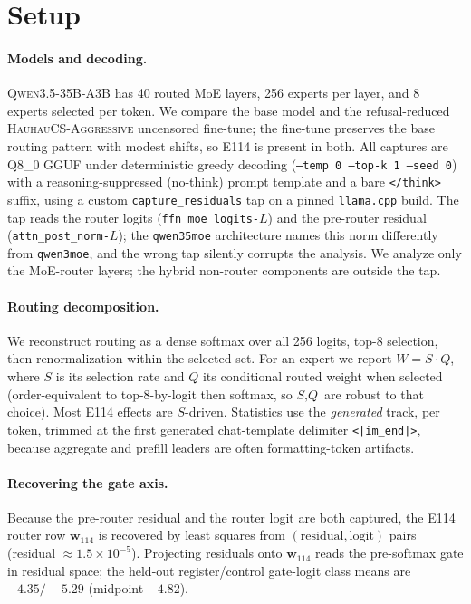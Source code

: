 \documentclass[10pt,a4paper,twocolumn]{article}
\newcommand{\W}{\textit{W}}
\newcommand{\Sel}{\textit{S}}
\newcommand{\Q}{\textit{Q}}
\newcommand{\wvec}{\mathbf{w}_{114}}
\begin{document}
\section{Setup}

\paragraph{Models and decoding.}
\textsc{Qwen3.5-35B-A3B} has 40 routed MoE layers, 256 experts per layer, and 8
experts selected per token. We compare the base model and the refusal-reduced
\textsc{HauhauCS-Aggressive} uncensored fine-tune; the fine-tune preserves the
base routing pattern with modest shifts, so E114 is present in both. All captures
are Q8\_0 GGUF under deterministic greedy decoding (\texttt{--temp 0 --top-k 1
--seed 0}) with a reasoning-suppressed (no-think) prompt template and a bare
\texttt{</think>} suffix, using a custom \texttt{capture\_residuals} tap on a
pinned \texttt{llama.cpp} build. The tap reads the router logits
(\texttt{ffn\_moe\_logits-}$L$) and the pre-router residual
(\texttt{attn\_post\_norm-}$L$); the \texttt{qwen35moe} architecture names this
norm differently from \texttt{qwen3moe}, and the wrong tap silently corrupts the
analysis. We analyze only the MoE-router layers; the hybrid non-router components
are outside the tap.

\paragraph{Routing decomposition.}
We reconstruct routing as a dense softmax over all 256 logits, top-8 selection,
then renormalization within the selected set. For an expert we report
$\W{=}\Sel\!\cdot\!\Q$, where $\Sel$ is its selection rate and $\Q$ its
conditional routed weight when selected (order-equivalent to top-8-by-logit then
softmax, so $\Sel,\Q$ are robust to that choice). Most E114 effects are
$\Sel$-driven. Statistics use the \emph{generated} track, per token, trimmed at
the first generated chat-template delimiter \texttt{<|im\_end|>}, because
aggregate and prefill leaders are often formatting-token artifacts.

\paragraph{Recovering the gate axis.}
Because the pre-router residual and the router logit are both captured, the E114
router row $\wvec$ is recovered by least squares from $(\text{residual},
\text{logit})$ pairs (residual $\approx 1.5\times10^{-5}$). Projecting residuals
onto $\wvec$ reads the pre-softmax gate in residual space; the held-out
register/control gate-logit class means are $-4.35/-5.29$ (midpoint $-4.82$).
\end{document}
